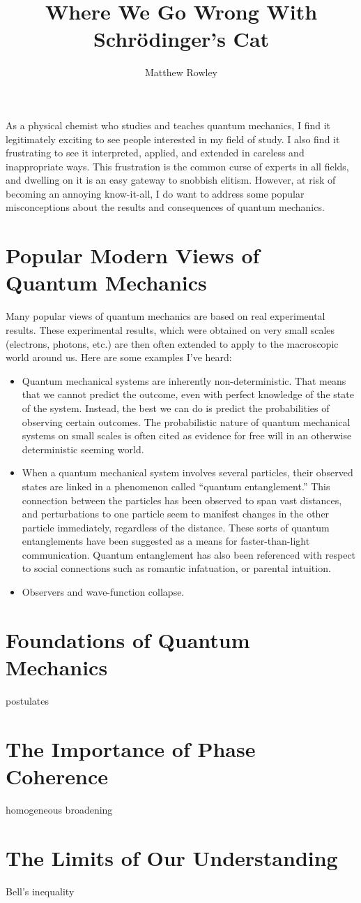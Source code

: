 \documentclass{memoir}
\begin{document}
\title{Where We Go Wrong With Schr\"odinger's Cat}
\author{Matthew Rowley}
\maketitle

As a physical chemist who studies and teaches quantum mechanics, I find it legitimately exciting to see people interested in my field of study. I also find it frustrating to see it interpreted, applied, and extended in careless and inappropriate ways. This frustration is the common curse of experts in all fields, and dwelling on it is an easy gateway to snobbish elitism. However, at risk of becoming an annoying know-it-all, I do want to address some popular misconceptions about the results and consequences of quantum mechanics.

\section*{Popular Modern Views of Quantum Mechanics}
Many popular views of quantum mechanics are based on real experimental results. These experimental results, which were obtained on very small scales (electrons, photons, etc.) are then often extended to apply to the macroscopic world around us. Here are some examples I've heard:

\begin{itemize}
\item Quantum mechanical systems are inherently non-deterministic. That means that we cannot predict the outcome, even with perfect knowledge of the state of the system. Instead, the best we can do is predict the probabilities of observing certain outcomes. The probabilistic nature of quantum mechanical systems on small scales is often cited as evidence for free will in an otherwise deterministic seeming world.
\item When a quantum mechanical system involves several particles, their observed states are linked in a phenomenon called ``quantum entanglement.'' This connection between the particles has been observed to span vast distances, and perturbations to one particle seem to manifest changes in the other particle immediately, regardless of the distance. These sorts of quantum entanglements have been suggested as a means for faster-than-light communication. Quantum entanglement has also been referenced with respect to social connections such as romantic infatuation, or parental intuition.
\item Observers and wave-function collapse.
\end{itemize}

\section*{Foundations of Quantum Mechanics}
postulates

\section*{The Importance of Phase Coherence}
homogeneous broadening

\section*{The Limits of Our Understanding}
Bell's inequality
\end{document}
